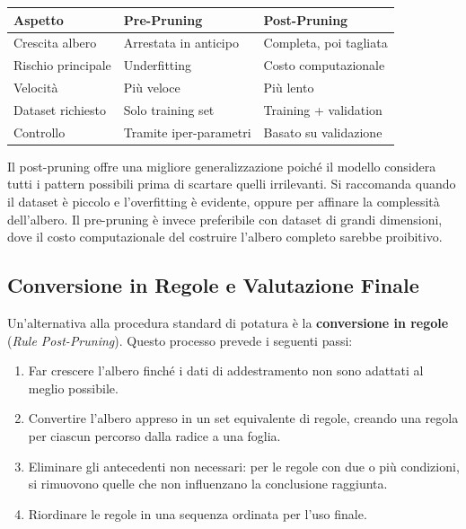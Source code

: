 \begin{table}[h!]
\centering
\begin{tabular}{lll}
\toprule
\textbf{Aspetto} &
\textbf{Pre-Pruning} &
\textbf{Post-Pruning} \\
\midrule
Crescita albero &
Arrestata in anticipo &
Completa, poi tagliata \\
Rischio principale &
Underfitting &
Costo computazionale \\
Velocità &
Più veloce &
Più lento \\
Dataset richiesto &
Solo training set &
Training + validation \\
Controllo &
Tramite iper-parametri &
Basato su validazione \\
\bottomrule
\end{tabular}
\end{table}

Il post-pruning offre una migliore generalizzazione
poiché il modello considera tutti i pattern possibili
prima di scartare quelli irrilevanti. Si raccomanda
quando il dataset è piccolo e l'overfitting è evidente,
oppure per affinare la complessità dell'albero. Il
pre-pruning è invece preferibile con dataset di grandi
dimensioni, dove il costo computazionale del costruire
l'albero completo sarebbe proibitivo.

\subsection{Conversione in Regole e Valutazione Finale}

Un'alternativa alla procedura standard di potatura è la
\textbf{conversione in regole} (\textit{Rule Post-Pruning}).
Questo processo prevede i seguenti passi:

\begin{enumerate}
    \item Far crescere l'albero finché i dati di
        addestramento non sono adattati al meglio
        possibile.
    \item Convertire l'albero appreso in un set
        equivalente di regole, creando una regola per
        ciascun percorso dalla radice a una foglia.
    \item Eliminare gli antecedenti non necessari:
        per le regole con due o più condizioni, si
        rimuovono quelle che non influenzano la
        conclusione raggiunta.
    \item Riordinare le regole in una sequenza ordinata
        per l'uso finale.
\end{enumerate}

